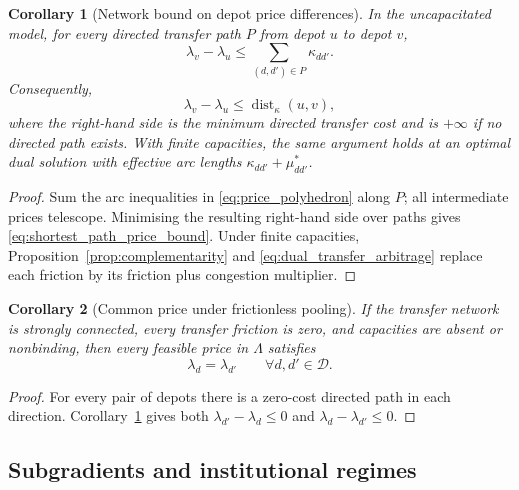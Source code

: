 \documentclass[authoryear,final,3p,times]{elsarticle}
\newtheorem{corollary}{Corollary}
\theoremstyle{definition}
\theoremstyle{plain}
\begin{document}
\begin{corollary}[Network bound on depot price differences]
\label{cor:shortest_path_price}
In the uncapacitated model, for every directed transfer path $P$ from depot
$u$ to depot $v$,
\begin{equation}
\lambda_v-\lambda_u\le\sum_{(d,d')\in P}\kappa_{dd'}.
\label{eq:path_price_bound}
\end{equation}
Consequently,
\begin{equation}
\lambda_v-\lambda_u\le\operatorname{dist}_\kappa(u,v),
\label{eq:shortest_path_price_bound}
\end{equation}
where the right-hand side is the minimum directed transfer cost and is
$+\infty$ if no directed path exists.  With finite capacities, the same
argument holds at an optimal dual solution with effective arc lengths
$\kappa_{dd'}+\mu_{dd'}^*$.
\end{corollary}

\begin{proof}
Sum the arc inequalities in \eqref{eq:price_polyhedron} along $P$; all
intermediate prices telescope.  Minimising the resulting right-hand side over
paths gives \eqref{eq:shortest_path_price_bound}.  Under finite capacities,
Proposition~\ref{prop:complementarity} and
\eqref{eq:dual_transfer_arbitrage} replace each friction by its friction plus
congestion multiplier.
\end{proof}

\begin{corollary}[Common price under frictionless pooling]
\label{cor:common_price}
If the transfer network is strongly connected, every transfer friction is
zero, and capacities are absent or nonbinding, then every feasible price in
$\Lambda$ satisfies
\begin{equation*}
\lambda_d=\lambda_{d'}
\qquad\forall d,d'\in\mathcal D.
\end{equation*}
\end{corollary}

\begin{proof}
For every pair of depots there is a zero-cost directed path in each direction.
Corollary~\ref{cor:shortest_path_price} gives both
$\lambda_{d'}-\lambda_d\le0$ and $\lambda_d-\lambda_{d'}\le0$.
\end{proof}

\subsection{Subgradients and institutional regimes}
\label{subsec:institutional}
\label{subsec:recourse_subgradient}
\end{document}
